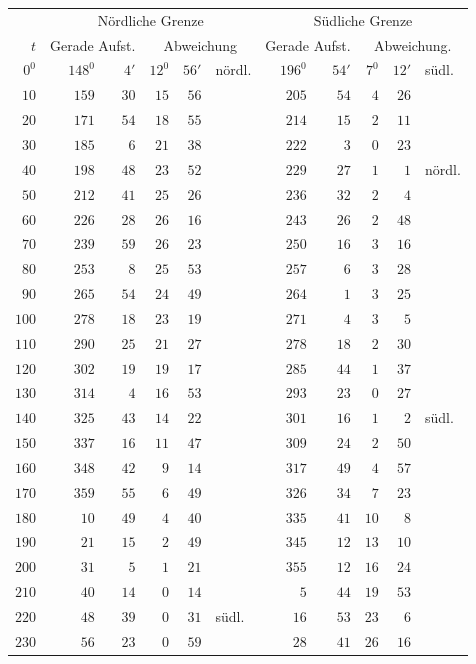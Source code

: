 \begin{center}
\begingroup\small\setlength{\tabcolsep}{5pt}
\begin{tabular}{r||rr|rrl||rr|rrl}
&\multicolumn{5}{c||}{Nördliche Grenze}&\multicolumn{5}{c}{Südliche Grenze}\\
$t$&\multicolumn{2}{c|}{Gerade Aufst.}&\multicolumn{3}{c||}{Abweichung}&\multicolumn{2}{c|}{Gerade Aufst.}&\multicolumn{3}{c}{Abweichung.}\\\hline
$0^0$&$148^0$&$4'$&$12^0$&$56'$&nördl.&$196^0$&$54'$&$7^0$&$12'$&südl.\\
$10$&$159$&$30$&$15$&$56$&&$205$&$54$&$4$&$26$&\\
$20$&$171$&$54$&$18$&$55$&&$214$&$15$&$2$&$11$&\\
$30$&$185$&$6$&$21$&$38$&&$222$&$3$&$0$&$23$&\\
$40$&$198$&$48$&$23$&$52$&&$229$&$27$&$1$&$1$&nördl.\\
$50$&$212$&$41$&$25$&$26$&&$236$&$32$&$2$&$4$&\\
$60$&$226$&$28$&$26$&$16$&&$243$&$26$&$2$&$48$&\\
$70$&$239$&$59$&$26$&$23$&&$250$&$16$&$3$&$16$&\\
$80$&$253$&$8$&$25$&$53$&&$257$&$6$&$3$&$28$&\\
$90$&$265$&$54$&$24$&$49$&&$264$&$1$&$3$&$25$&\\
$100$&$278$&$18$&$23$&$19$&&$271$&$4$&$3$&$5$&\\
$110$&$290$&$25$&$21$&$27$&&$278$&$18$&$2$&$30$&\\
$120$&$302$&$19$&$19$&$17$&&$285$&$44$&$1$&$37$&\\
$130$&$314$&$4$&$16$&$53$&&$293$&$23$&$0$&$27$&\\
$140$&$325$&$43$&$14$&$22$&&$301$&$16$&$1$&$2$&südl.\\
$150$&$337$&$16$&$11$&$47$&&$309$&$24$&$2$&$50$&\\
$160$&$348$&$42$&$9$&$14$&&$317$&$49$&$4$&$57$&\\
$170$&$359$&$55$&$6$&$49$&&$326$&$34$&$7$&$23$&\\
$180$&$10$&$49$&$4$&$40$&&$335$&$41$&$10$&$8$&\\
$190$&$21$&$15$&$2$&$49$&&$345$&$12$&$13$&$10$&\\
$200$&$31$&$5$&$1$&$21$&&$355$&$12$&$16$&$24$&\\
$210$&$40$&$14$&$0$&$14$&&$5$&$44$&$19$&$53$&\\
$220$&$48$&$39$&$0$&$31$&südl.&$16$&$53$&$23$&$6$&\\
$230$&$56$&$23$&$0$&$59$&&$28$&$41$&$26$&$16$&\\

\end{tabular}
\end{center}
